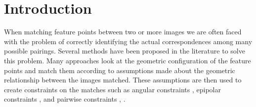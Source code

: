 \documentclass[conference]{IEEEtran}
\begin{document}
\section{Introduction}
%
When matching feature points between two or more images we are often 
faced with the problem of correctly identifying the actual 
correspondences among many possible pairings. Several methods have been 
proposed in the literature to solve this problem. Many approaches look 
at the geometric configuration of the feature points and match them 
according to assumptions made about the geometric relationship between 
the images matched. These assumptions are then used to create 
constraints on the matches such as angular constraints 
\cite{kim2008efficient}, epipolar constraints \cite{torr2000mlesac}, 
\cite{chum2005matching} and pairwise constraints \cite{choi2009robust}, 
\cite{leordeanu2005spectral}.
%
\end{document}
